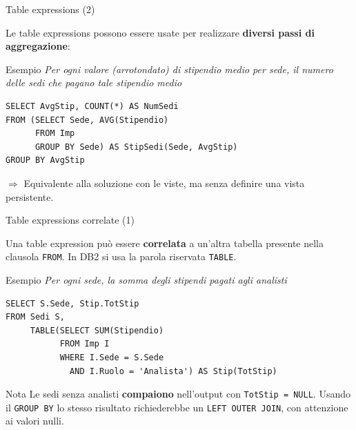 \documentclass[aspectratio=169]{beamer}
\begin{document}
\begin{frame}[fragile]{Table expressions (2)}

Le table expressions possono essere usate per realizzare \textbf{diversi passi di aggregazione}:

\begin{block}{Esempio}
\textit{Per ogni valore (arrotondato) di stipendio medio per sede, il numero delle sedi che pagano tale stipendio medio}
\end{block}

\begin{lstlisting}
SELECT AvgStip, COUNT(*) AS NumSedi
FROM (SELECT Sede, AVG(Stipendio)
      FROM Imp
      GROUP BY Sede) AS StipSedi(Sede, AvgStip)
GROUP BY AvgStip
\end{lstlisting}

\vspace{4pt}
$\Rightarrow$ Equivalente alla soluzione con le viste, ma senza definire una vista persistente.

\end{frame}

\begin{frame}[fragile]{Table expressions correlate (1)}

Una table expression può essere \textbf{correlata} a un'altra tabella presente nella clausola \texttt{FROM}. In DB2 si usa la parola riservata \texttt{TABLE}.

\begin{block}{Esempio}
\textit{Per ogni sede, la somma degli stipendi pagati agli analisti}
\end{block}

\begin{lstlisting}
SELECT S.Sede, Stip.TotStip
FROM Sedi S,
     TABLE(SELECT SUM(Stipendio)
           FROM Imp I
           WHERE I.Sede = S.Sede
             AND I.Ruolo = 'Analista') AS Stip(TotStip)
\end{lstlisting}

\vspace{4pt}
\begin{block}{Nota}
Le sedi senza analisti \textbf{compaiono} nell'output con \texttt{TotStip = NULL}. Usando il \texttt{GROUP BY} lo stesso risultato richiederebbe un \texttt{LEFT OUTER JOIN}, con attenzione ai valori nulli.
\end{block}

\end{frame}
\end{document}
